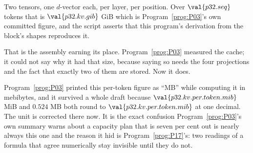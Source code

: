 \begin{fr}

Two tensors, one $d$-vector each, per layer, per position. Over
$\val{p32.seq}$ tokens that is $\val{p32.kv.gib}$ GiB \dash{} which is
Program~\ref{prog:P03}'s own committed figure, and the script asserts that
this program's derivation from the block's shapes reproduces it.

That is the assembly earning its place. Program~\ref{prog:P03} measured the
cache; it could not say why it had that size, because saying so needs the
four projections and the fact that exactly two of them are stored. Now it
does.

\begin{note}
Program~\ref{prog:P03} printed this per-token figure as \enquote{MB} while
computing it in mebibytes, and it survived a whole draft because
$\val{p32.kv.per.token.mib}$ MiB and $\num{0.524}$ MB both round to
$\val{p32.kv.per.token.mib}$ at one decimal. The unit is corrected there
now. It is the exact confusion Program~\ref{prog:P03}'s own summary warns
about \dash{} a capacity plan that is seven per cent out is nearly always
this one \dash{} and the reason it hid is Program~\ref{prog:P17}'s: two
readings of a formula that agree numerically stay invisible until they do
not.
\end{note}
\end{fr}

